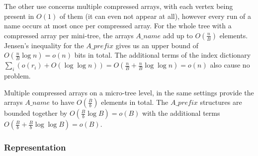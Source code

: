 The other use concerns multiple compressed arrays, with each vertex being present in $O(1)$ of them (it can even not appear at all), however every run of a name occurs at most once per compressed array.
For the whole tree with a compressed array per mini-tree, the arrays $A\_name$ add up to $O(\frac{n}{B})$ elements.
Jensen's inequality for the $A\_prefix$ gives us an upper bound of $O(\frac{n}{B} \log n) = o(n)$ bits in total.
The additional terms of the index dictionary $\sum_i (o(r_i) + O(\log \log n)) = O(\frac{n}{B} + \frac{n}{B} \log \log n) = o(n)$ also cause no problem.

Multiple compressed arrays on a micro-tree level, in the same settings provide the arrays $A\_name$ to have $O(\frac{B}{b})$ elements in total.
The $A\_prefix$ structures are bounded together by $O(\frac{B}{b} \log B) = o(B)$ with the additional terms $O(\frac{B}{b} + \frac{B}{b} \log \log B) = o(B)$.

\subsubsection{Representation}

